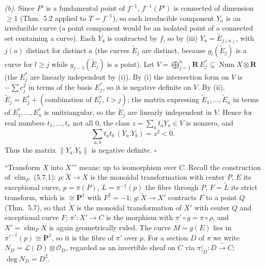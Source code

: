 \documentclass[11pt]{article}
\begin{document}
\emph{(b).} Since $P'$ is a fundamental point of $f^{-1}$, $f^{-1}(P')$ is connected of dimension $\ge1$ (Thm.~5.2 applied to $T=f^{-1}$), so each irreducible component $Y_a$ is an irreducible curve (a point component would be an isolated point of a connected set containing a curve). Each $Y_a$ is contracted by $f$, so by (iii) $Y_a=\widetilde E_{j(a)}$, with $j(a)$ distinct for distinct $a$ (the curves $\widetilde E_j$ are distinct, because $g_{l}(\widetilde E_j)$ is a curve for $l\ge j$ while $g_{j-1}(\widetilde E_j)$ is a point). Let $V=\bigoplus_{j=1}^n\mathbf R\,E_j^*\subseteq\operatorname{Num}X\otimes\mathbf R$ (the $E_j^*$ are linearly independent by (i)). By (i) the intersection form on $V$ is $-\sum c_j^2$ in terms of the basis $E_j^*$, so it is negative definite on $V$. By (ii), $\widetilde E_j=E_j^*+(\text{combination of }E_l^*,\,l>j)$; the matrix expressing $\widetilde E_1,\dots,\widetilde E_n$ in terms of $E_1^*,\dots,E_n^*$ is unitriangular, so the $\widetilde E_j$ are linearly independent in $V$. Hence for real numbers $t_1,\dots,t_r$ not all $0$, the class $z=\sum_at_aY_a\in V$ is nonzero, and
\[
\sum_{a,b}t_at_b\,(Y_a.Y_b)=z^2<0 .
\]
Thus the matrix $\|Y_a.Y_b\|$ is negative definite. \hfill$\square$

\pf
``Transform $X$ into $X'$'' means: up to isomorphism over $C$. Recall the construction of $\operatorname{elm}_P$ (5.7.1): $\rho:\widetilde X\to X$ is the monoidal transformation with center $P$, $E$ its exceptional curve, $p=\pi(P)$, $L=\pi^{-1}(p)$ the fibre through $P$, $F=\widetilde L$ its strict transform, which is $\cong\mathbf P^1$ with $F^2=-1$; $g:\widetilde X\to X'$ contracts $F$ to a point $Q$ (Thm.~5.7), so that $\widetilde X$ is the monoidal transformation of $X'$ with center $Q$ and exceptional curve $F$; $\pi':X'\to C$ is the morphism with $\pi'\circ g=\pi\circ\rho$, and $X'=\operatorname{elm}_PX$ is again geometrically ruled. The curve $M=g(E)$ lies in $\pi'^{-1}(p)\cong\mathbf P^1$, so it is the fibre of $\pi'$ over $p$. For a section $D$ of $\pi$ we write $N_D=\mathcal L(D)\otimes\mathcal O_D$, regarded as an invertible sheaf on $C$ via $\pi|_D:D\xrightarrow{\ \sim\ }C$; $\deg N_D=D^2$.
\end{document}
